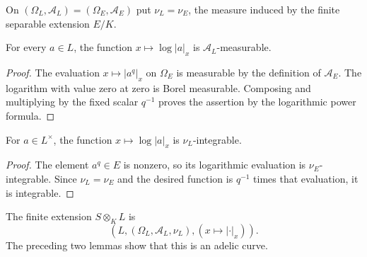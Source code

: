 \begin{definition}
\label{def:finite-measure}
\leanok
{}
On $(\Omega_L,\mathcal A_L)=(\Omega_E,\mathcal A_E)$ put
$\nu_L=\nu_E$, the measure induced by the finite separable extension
$E/K$.
\end{definition}

\begin{lemma}
\label{lem:finite-log-measurable}
\leanok
{}
For every $a\in L$, the function $x\mapsto\log|a|_x$ is
$\mathcal A_L$-measurable.
\end{lemma}
\begin{proof}
The evaluation $x\mapsto|a^q|_x$ on $\Omega_E$ is measurable by the
definition of $\mathcal A_E$. The logarithm with value zero at zero is
Borel measurable. Composing and multiplying by the fixed scalar
$q^{-1}$ proves the assertion by the logarithmic power formula.
\end{proof}

\begin{lemma}
\label{lem:finite-log-integrable}
\leanok
{}
For $a\in L^\times$, the function $x\mapsto\log|a|_x$ is
$\nu_L$-integrable.
\end{lemma}
\begin{proof}
The element $a^q\in E$ is nonzero, so its logarithmic evaluation is
$\nu_E$-integrable. Since $\nu_L=\nu_E$ and the desired function is
$q^{-1}$ times that evaluation, it is integrable.
\end{proof}

\begin{definition}
\label{def:finite-extension}
\leanok
{}
The finite extension $S\otimes_KL$ is
\[
 (L,(\Omega_L,\mathcal A_L,\nu_L),(x\mapsto|\cdot|_x)).
\]
The preceding two lemmas show that this is an adelic curve.
\end{definition}

